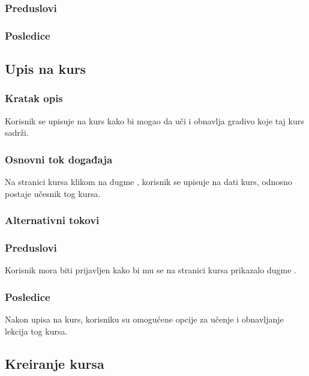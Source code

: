 \subsubsection{Preduslovi}

\subsubsection{Posledice}



\subsection{Upis na kurs}
\label{subsec:upis-na-kurs}

\subsubsection{Kratak opis}
Korisnik se upisuje na kurs kako bi mogao da uči i obnavlja gradivo koje taj kurs sadrži.

\subsubsection{Osnovni tok događaja}
Na stranici kursa klikom na dugme , korisnik se upisuje na dati kurs, odnosno postaje učesnik tog kursa.

\subsubsection{Alternativni tokovi}

\subsubsection{Preduslovi}
Korisnik mora biti prijavljen kako bi mu se na stranici kursa prikazalo dugme .

\subsubsection{Posledice}
Nakon upisa na kurs, korisniku su omogućene opcije za učenje i obnavljanje lekcija tog kursa.



\subsection{Kreiranje kursa}
\label{subsec:kreiranje-kursa}

